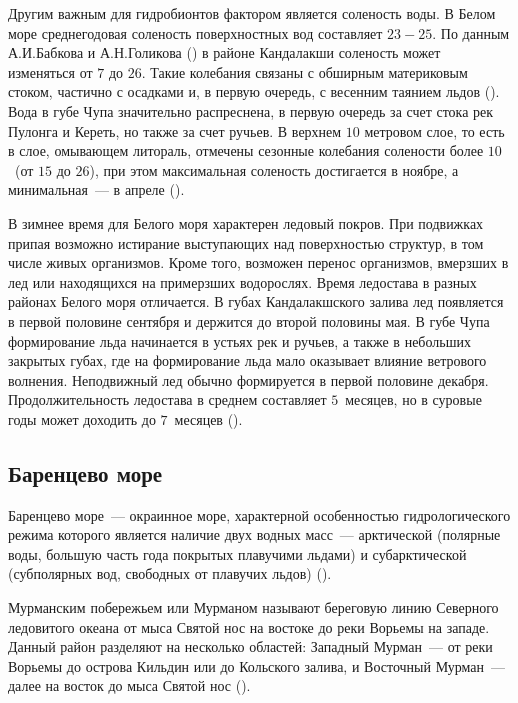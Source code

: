 Другим важным для гидробионтов фактором является соленость воды. 
В Белом море среднегодовая соленость поверхностных вод составляет $23-25$\permil. 
По данным А.И.Бабкова и А.Н.Голикова (\cite*{Babkov_Golikov_1984}) в районе Кандалакши соленость может изменяться от $7$ до $26$\permil. 
Такие колебания связаны с обширным материковым стоком, частично с осадками и, в первую очередь, с весенним таянием льдов (\cite{Naumov_Fedyakov_1993}).
Вода в губе Чупа значительно распреснена, в первую очередь за счет стока рек Пулонга и Кереть, но также за счет ручьев. 
В верхнем $10$ метровом слое, то есть в слое, омывающем литораль, отмечены сезонные колебания солености более $10$\permil\ (от $15$ до $26$\permil), при этом максимальная соленость достигается в ноябре, а минимальная~--- в апреле (\cite{Babkov_1982}). 

В зимнее время для Белого моря характерен ледовый покров. 
При подвижках припая возможно истирание выступающих над поверхностью структур, в том числе живых организмов. 
Кроме того, возможен перенос организмов, вмерзших в лед или находящихся на примерзших водорослях.
 Время ледостава в разных районах Белого моря отличается. 
В губах Кандалакшского залива лед появляется в первой половине сентября и держится до второй половины мая. 
В губе Чупа формирование льда начинается в устьях рек и ручьев, а также в небольших закрытых губах, где на формирование льда мало оказывает влияние ветрового волнения. 
Неподвижный лед обычно формируется в первой половине декабря. 
Продолжительность ледостава в среднем составляет $5$~месяцев, но в суровые годы может доходить до $7$~месяцев (\cite{Babkov_Golikov_1984}). 

	\subsection{Баренцево море}

Баренцево море~--- окраинное море, характерной особенностью гидрологического режима которого является наличие двух  водных масс~--- арктической (полярные воды, большую часть года покрытых плавучими льдами) и субарктической (субполярных вод, свободных от плавучих льдов) (\cite{Adrov_1992}). 

Мурманским побережьем или Мурманом называют береговую линию Северного ледовитого океана от мыса Святой нос на востоке до реки Ворьемы на западе. 
Данный район разделяют на несколько областей: Западный Мурман~--- от реки Ворьемы до острова Кильдин или до Кольского залива, и Восточный Мурман~--- далее на восток до мыса Святой нос (\cite{Derugin_1915}).

